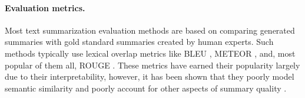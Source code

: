\documentclass[11pt,a4paper]{article}
\begin{document}




\paragraph{Evaluation metrics.} Most text summarization evaluation methods are based on comparing generated summaries with gold standard summaries created by human experts. Such methods typically use lexical overlap metrics like BLEU \cite{papineni2002bleu}, METEOR \cite{banerjee2005meteor}, and, most popular of them all, ROUGE \cite{lin2004rouge}. These metrics have earned their popularity largely due to their interpretability, however, it has been shown that they poorly model semantic similarity and poorly account for other aspects of summary quality \cite{fabbri2021summeval}.
\end{document}
